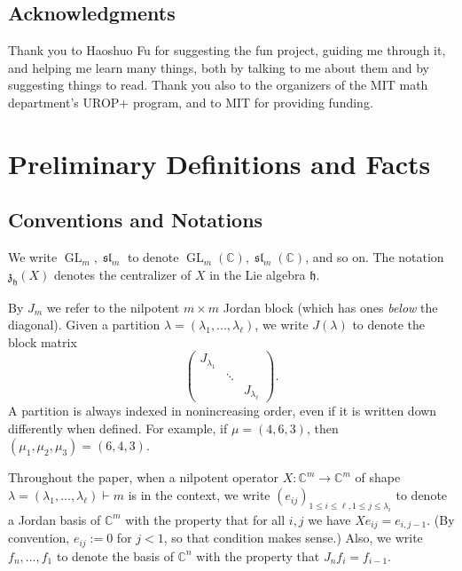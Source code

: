 \documentclass[12pt,psamsfonts]{article}
\DeclareMathOperator{\GL}{GL}
\DeclareMathOperator{\spl}{\mathfrak{sl}}
\begin{document}
\subsection{Acknowledgments}
Thank you to Haoshuo Fu for suggesting the fun project, guiding me through it, and helping me learn many things, both by talking to me about them and by suggesting things to read.
Thank you also to the organizers of the MIT math department's UROP+ program, and to MIT for providing funding.

\section{Preliminary Definitions and Facts}\label{prelim}
\subsection{Conventions and Notations}
We write \(\GL_m, \spl_m\) to denote \(\GL_m(\mathbb{C}), \spl_m(\mathbb{C})\), and so on.
The notation \(\mathfrak{z}_\mathfrak{h}(X)\) denotes the centralizer of \(X\) in the Lie algebra \(\mathfrak{h}\).
\par By \(J_m\) we refer to the nilpotent \(m \times m\) Jordan block (which has ones \emph{below} the diagonal).
Given a partition \(\lambda = (\lambda_1, ..., \lambda_\ell)\), we write \(J(\lambda)\) to denote the block matrix
\[\begin{pmatrix}
    J_{\lambda_1} \\
    & \ddots \\
    & & J_{\lambda_\ell}
\end{pmatrix}.\]
A partition is always indexed in nonincreasing order, even if it is written down differently when defined.
For example, if \(\mu = (4, 6, 3)\), then \((\mu_1, \mu_2, \mu_3) = (6, 4, 3)\).
\par Throughout the paper, when a nilpotent operator \(X : \mathbb{C}^m \to \mathbb{C}^m\) of shape \(\lambda = (\lambda_1, ..., \lambda_\ell) \vdash m\) is in the context, we write \((e_{ij})_{1 \leq i \leq \ell, 1 \leq j \leq \lambda_i}\) to denote a Jordan basis of \(\mathbb{C}^m\) with the property that for all \(i,j\) we have \(Xe_{ij} = e_{i,j - 1}\).
(By convention, \(e_{ij} := 0\) for \(j < 1\), so that condition makes sense.)
Also, we write \(f_n, ..., f_1\) to denote the basis of \(\mathbb{C}^n\) with the property that \(J_n f_i = f_{i - 1}\).
\end{document}
